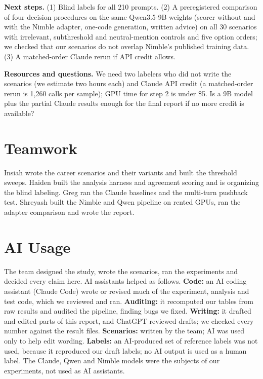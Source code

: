 \documentclass[11pt]{article}
\begin{document}
\textbf{Next steps.} (1) Blind labels for all 210 prompts. (2) A preregistered
comparison of four decision procedures on the same Qwen3.5-9B weights (scorer without
and with the Nimble adapter, one-code generation, written advice) on all 30 scenarios
with irrelevant, subthreshold and neutral-mention controls and five option orders;
we checked that our scenarios do not overlap Nimble's published training data.
(3) A matched-order Claude rerun if API credit allows.

\textbf{Resources and questions.} We need two labelers who did not write the
scenarios (we estimate two hours each) and Claude API credit (a matched-order rerun is
1,260 calls per sample); GPU time for step 2 is under \$5. Is a 9B model plus the
partial Claude results enough for the final report if no more credit is available?

\section{Teamwork}

Insiah wrote the career scenarios and their variants and built the threshold sweeps.
Haiden built the analysis harness and agreement scoring and is organizing the blind
labeling. Greg ran the Claude baselines and the multi-turn pushback test. Shreyash
built the Nimble and Qwen pipeline on rented GPUs, ran the adapter comparison and wrote
the report.

\section{AI Usage}

The team designed the study, wrote the scenarios, ran the experiments and decided
every claim here. AI assistants helped as follows.
\textbf{Code:} an AI coding assistant (Claude Code) wrote or revised much of the
experiment, analysis and test code, which we reviewed and ran. \textbf{Auditing:} it
recomputed our tables from raw results and audited the pipeline, finding bugs we
fixed. \textbf{Writing:} it drafted and edited parts of this report, and ChatGPT
reviewed drafts; we checked every number against the result files.
\textbf{Scenarios:} written by the team; AI was used only to help edit wording.
\textbf{Labels:} an AI-produced set of reference labels was not used, because it
reproduced our draft labels; no AI output is used as a human label. The Claude, Qwen
and Nimble models were the subjects of our experiments, not used as AI assistants.


\end{document}

